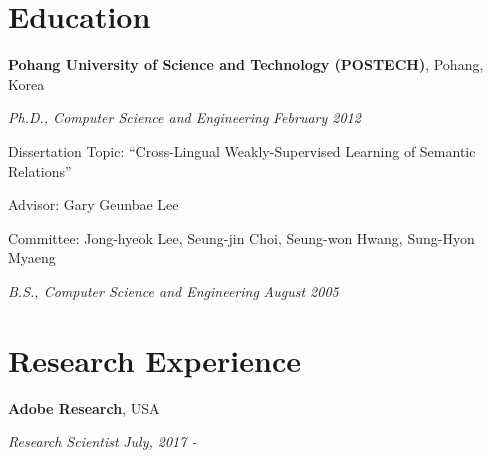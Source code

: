 \documentclass[margin,line]{res}
\newenvironment{list1}{
  \begin{list}{\ding{113}}{%
      \setlength{\itemsep}{0in}
      \setlength{\parsep}{0in} \setlength{\parskip}{0in}
      \setlength{\topsep}{0in} \setlength{\partopsep}{0in}
      \setlength{\leftmargin}{0.17in}}}{\end{list}}
\begin{document}
\begin{resume}
\section{\sc Education}
{\bf Pohang University of Science and Technology (POSTECH)}, Pohang, Korea\\
\vspace*{-.3cm}
\begin{list1}
\item[] {\em Ph.D., Computer Science and Engineering} \hfill {\em February 2012}\\
  \vspace*{-.3cm}
  \begin{list1}
  \item [] Dissertation Topic:  ``Cross-Lingual Weakly-Supervised Learning of Semantic Relations''
  \item [] Advisor:  Gary Geunbae Lee
  \item [] Committee: Jong-hyeok Lee, Seung-jin Choi, Seung-won Hwang, Sung-Hyon Myaeng
  \end{list1}
  \vspace*{.3cm}
\item[] {\em B.S., Computer Science and Engineering} \hfill {\em August 2005}\\
  \vspace*{-.3cm}
\end{list1}

\section{\sc Research Experience}
{\bf Adobe Research}, USA\\
\vspace{-.3cm}
\begin{list1}
\item[] {\em Research Scientist} \hfill {\em July, 2017 -}\\
  \vspace{-.3cm}
\end{list1}


\end{resume}
\end{document}
